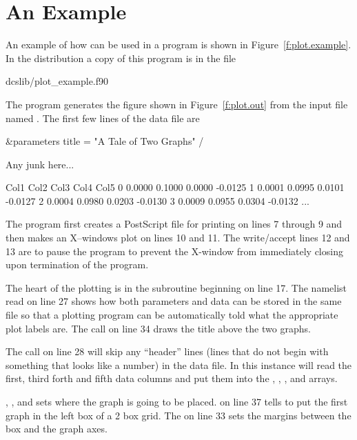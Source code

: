 \section{An Example}
\label{s:plot.example}

An example of how \quickplot can be used in a program is shown in
Figure~\ref{f:plot.example}. In the \bmad distribution a copy of this
program is in the file
\begin{example}
  dcslib/plot_example.f90
\end{example}
The  program generates the figure shown in
Figure~\ref{f:plot.out} from the input file named . The
first few lines of the data file are
\begin{example}
  \&parameters
    title = "A Tale of Two Graphs"
  /
 
  Any junk here...
 
  Col1      Col2      Col3      Col4      Col5
     0    0.0000    0.1000    0.0000   -0.0125
     1    0.0001    0.0995    0.0101   -0.0127
     2    0.0004    0.0980    0.0203   -0.0130
     3    0.0009    0.0955    0.0304   -0.0132
     ...
\end{example}

The program first creates a PostScript file for printing on lines 7
through 9 and then makes an X--windows plot on lines 10 and 11. The
write/accept lines 12 and 13 are to pause the program to prevent the
X-window from immediately closing upon termination of the program.

The heart of the plotting is in the subroutine  beginning
on line 17. The namelist read on line 27 shows how both parameters and
data can be stored in the same file so that a plotting program can be
automatically told what the appropriate plot labels are. The
 call on line 34 draws the title above the two graphs.

The  call on line 28 will skip any ``header'' lines
(lines that do not begin with something that looks like a number) in
the data file. In this instance  will read the
first, third forth and fifth data columns and put them into the
, , , and  arrays.

, , and 
sets where the graph is going to be placed.   on line 37 tells \quickplot to put the first graph in the
left box of a 2 box grid. The  on line 33 sets the
margins between the box and the graph axes.

